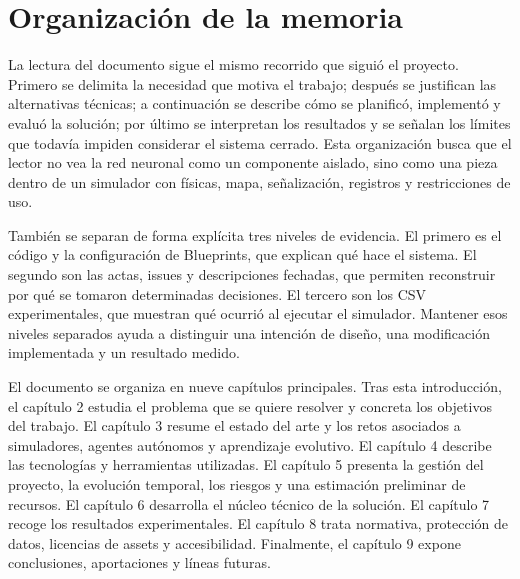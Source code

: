 \section{Organización de la memoria}

La lectura del documento sigue el mismo recorrido que siguió el proyecto. Primero se delimita la necesidad que motiva el trabajo; después se justifican las alternativas técnicas; a continuación se describe cómo se planificó, implementó y evaluó la solución; por último se interpretan los resultados y se señalan los límites que todavía impiden considerar el sistema cerrado. Esta organización busca que el lector no vea la red neuronal como un componente aislado, sino como una pieza dentro de un simulador con físicas, mapa, señalización, registros y restricciones de uso.

También se separan de forma explícita tres niveles de evidencia. El primero es el código y la configuración de Blueprints, que explican qué hace el sistema. El segundo son las actas, issues y descripciones fechadas, que permiten reconstruir por qué se tomaron determinadas decisiones. El tercero son los CSV experimentales, que muestran qué ocurrió al ejecutar el simulador. Mantener esos niveles separados ayuda a distinguir una intención de diseño, una modificación implementada y un resultado medido.

El documento se organiza en nueve capítulos principales. Tras esta introducción, el capítulo 2 estudia el problema que se quiere resolver y concreta los objetivos del trabajo. El capítulo 3 resume el estado del arte y los retos asociados a simuladores, agentes autónomos y aprendizaje evolutivo. El capítulo 4 describe las tecnologías y herramientas utilizadas. El capítulo 5 presenta la gestión del proyecto, la evolución temporal, los riesgos y una estimación preliminar de recursos. El capítulo 6 desarrolla el núcleo técnico de la solución. El capítulo 7 recoge los resultados experimentales. El capítulo 8 trata normativa, protección de datos, licencias de assets y accesibilidad. Finalmente, el capítulo 9 expone conclusiones, aportaciones y líneas futuras.
